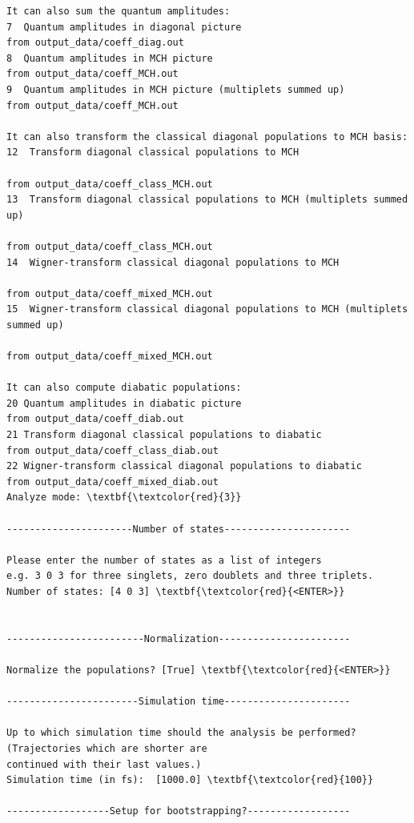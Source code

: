 \documentclass[a4paper,11pt,DIV=15,openany]{scrbook}
\begin{document}
\begin{oframed}
\begin{Verbatim}[commandchars=\\\{\}]
It can also sum the quantum amplitudes:
7  Quantum amplitudes in diagonal picture                                    from output_data/coeff_diag.out
8  Quantum amplitudes in MCH picture                                         from output_data/coeff_MCH.out
9  Quantum amplitudes in MCH picture (multiplets summed up)                  from output_data/coeff_MCH.out

It can also transform the classical diagonal populations to MCH basis:
12  Transform diagonal classical populations to MCH
                                                                        from output_data/coeff_class_MCH.out
13  Transform diagonal classical populations to MCH (multiplets summed up)
                                                                        from output_data/coeff_class_MCH.out 
14  Wigner-transform classical diagonal populations to MCH
                                                                        from output_data/coeff_mixed_MCH.out
15  Wigner-transform classical diagonal populations to MCH (multiplets summed up)
                                                                        from output_data/coeff_mixed_MCH.out

It can also compute diabatic populations:
20 Quantum amplitudes in diabatic picture                              from output_data/coeff_diab.out
21 Transform diagonal classical populations to diabatic                from output_data/coeff_class_diab.out
22 Wigner-transform classical diagonal populations to diabatic         from output_data/coeff_mixed_diab.out
Analyze mode: \textbf{\textcolor{red}{3}}

----------------------Number of states----------------------

Please enter the number of states as a list of integers
e.g. 3 0 3 for three singlets, zero doublets and three triplets.
Number of states: [4 0 3] \textbf{\textcolor{red}{<ENTER>}}


------------------------Normalization-----------------------

Normalize the populations? [True] \textbf{\textcolor{red}{<ENTER>}}

-----------------------Simulation time----------------------

Up to which simulation time should the analysis be performed? (Trajectories which are shorter are 
continued with their last values.)
Simulation time (in fs):  [1000.0] \textbf{\textcolor{red}{100}}

------------------Setup for bootstrapping?------------------


\end{Verbatim}
\end{oframed}
\end{document}
